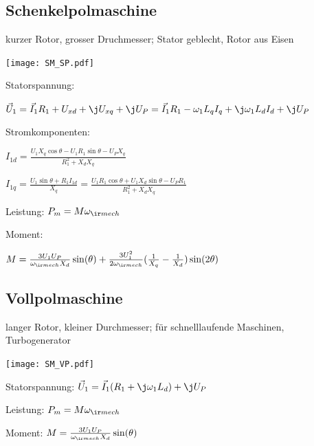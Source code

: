\documentclass[german]{latex4ei_fs}
\begin{document}
\begin{sectionbox}
\subsection{Schenkelpolmaschine}
kurzer Rotor, grosser Druchmesser; Stator geblecht, Rotor aus Eisen

\texttt{[image: SM\_SP.pdf]}

Statorspannung:

$\vec U_1 = \vec I_1 R_1 + U_{xd} + \j U_{xq} + \j U_P = \vec I_1 R_1 - \omega_1 L_q I_q + \j \omega_1 L_d I_d + \j U_P$

Stromkomponenten:

$I_{1d} = \frac{U_1 X_q \cos \theta - U_1 R_1 \sin \theta - U_P X_q}{R_1^2 + X_d X_q}$

$I_{1q} = \frac{U_1 \sin \theta + R_1 I_{1d}}{X_q} = \frac{U_1 R_1 \cos \theta + U_1 X_d \sin \theta - U_P R_1}{R_1^2 + X_d X_q}$ 

Leistung:
 $P_m = M \omega_{\ir mech}$

Moment: 

$M = \frac{3 U_1 U_P}{\omega_{\ir mech} X_d} \sin (\theta ) + \frac{3 U_1^2}{2 \omega_{\ir mech}} (\frac{1}{X_q} - \frac{1}{X_d} ) \sin ( 2 \theta )$
\end{sectionbox}

\begin{sectionbox}
 \subsection{Vollpolmaschine}

 langer Rotor, kleiner Durchmesser; 
für schnelllaufende Maschinen, Turbogenerator

\texttt{[image: SM\_VP.pdf]}


Statorspannung:
$\vec U_1 = \vec I_1 (R_1 + \j \omega_1 L_d) + \j U_P$

Leistung:
 $P_m = M \omega_{\ir mech}$

Moment: 
$M = \frac{3 U_1 U_P}{\omega_{\ir mech} X_d} \sin ( \theta ) $
\end{sectionbox}
\end{document}
